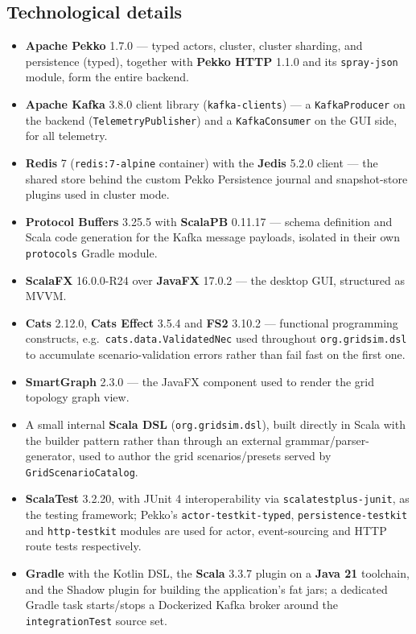 \documentclass{scrreprt}
\begin{document}
\subsection{Technological details}\label{technological-details}

\begin{itemize}
  \item \textbf{Apache Pekko} 1.7.0 --- typed actors, cluster, cluster sharding, and persistence
  (typed), together with \textbf{Pekko HTTP} 1.1.0 and its \texttt{spray-json} module, form the
  entire backend.

  \item \textbf{Apache Kafka} 3.8.0 client library (\texttt{kafka-clients}) --- a
  \texttt{KafkaProducer} on the backend (\texttt{TelemetryPublisher}) and a
  \texttt{KafkaConsumer} on the GUI side, for all telemetry.

  \item \textbf{Redis} 7 (\texttt{redis:7-alpine} container) with the \textbf{Jedis} 5.2.0
  client --- the shared store behind the custom Pekko Persistence journal and snapshot-store
  plugins used in cluster mode.

  \item \textbf{Protocol Buffers} 3.25.5 with \textbf{ScalaPB} 0.11.17 --- schema definition and
  Scala code generation for the Kafka message payloads, isolated in their own \texttt{protocols}
  Gradle module.

  \item \textbf{ScalaFX} 16.0.0-R24 over \textbf{JavaFX} 17.0.2 --- the desktop GUI, structured
  as MVVM.

  \item \textbf{Cats} 2.12.0, \textbf{Cats Effect} 3.5.4 and \textbf{FS2} 3.10.2 --- functional
  programming constructs, e.g.\ \texttt{cats.data.ValidatedNec} used throughout
  \texttt{org.gridsim.dsl} to accumulate scenario-validation errors rather than fail fast on the
  first one.

  \item \textbf{SmartGraph} 2.3.0 --- the JavaFX component used to render the grid topology
  graph view.

  \item A small internal \textbf{Scala DSL} (\texttt{org.gridsim.dsl}), built directly in Scala
  with the builder pattern rather than through an external grammar/parser-generator, used to
  author the grid scenarios/presets served by \texttt{GridScenarioCatalog}.

  \item \textbf{ScalaTest} 3.2.20, with JUnit 4 interoperability via
  \texttt{scalatestplus-junit}, as the testing framework; Pekko's \texttt{actor-testkit-typed},
  \texttt{persistence-testkit} and \texttt{http-testkit} modules are used for actor,
  event-sourcing and HTTP route tests respectively.

  \item \textbf{Gradle} with the Kotlin DSL, the \textbf{Scala} 3.3.7 plugin on a
  \textbf{Java 21} toolchain, and the Shadow plugin for building the application's fat jars;
  a dedicated Gradle task starts/stops a Dockerized Kafka broker around the
  \texttt{integrationTest} source set.
\end{itemize}
\end{document}
